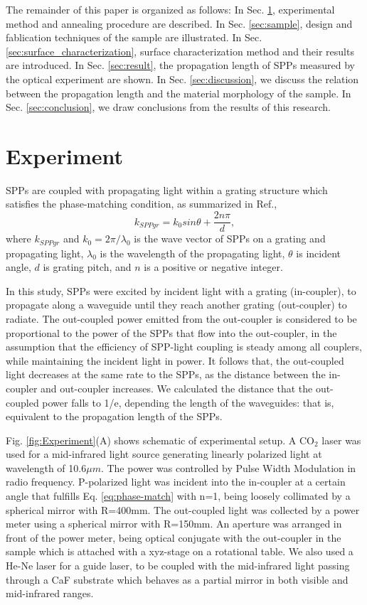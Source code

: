 \documentclass[twocolumn,11pt,a4]{article}
\begin{document}
The remainder of this paper is organized as follows: 
In Sec. \ref{sec:experiment}, experimental method and annealing procedure are described.
In Sec. \ref{sec:sample}, design and fablication techniques of the sample are illustrated.
In Sec. \ref{sec:surface_characterization}, surface characterization method and their results are introduced.
In Sec. \ref{sec:result}, the propagation length of SPPs measured by the optical experiment are shown.
In Sec. \ref{sec:discussion}, we discuss the relation between the propagation length and the material morphology of the sample.
In Sec. \ref{sec:conclusion}, we draw conclusions from the results of this research.

\section{Experiment}
\label{sec:experiment}
SPPs are coupled with propagating light within a grating structure which satisfies the phase-matching condition, as summarized in Ref.\cite{Koev},
\begin{equation}
k_{SPPgr}=k_0 sin\theta + \frac{2n\pi}{d},
\label{eq:phase-match}
\end{equation}
where $k_{SPPgr}$ and $k_0=2\pi/\lambda_0$ is the wave vector of SPPs on a grating and propagating light, $\lambda_0$ is the wavelength of the propagating light, $\theta$ is incident angle, $d$ is grating pitch, and $n$ is a positive or negative integer. 

In this study, SPPs were excited by incident light with a grating (in-coupler), to propagate along a waveguide until they reach another grating (out-coupler) to radiate. The out-coupled power emitted from the out-coupler is considered to be proportional to the power of the SPPs that flow into the out-coupler, in the assumption that the efficiency of SPP-light coupling is steady among all couplers, while maintaining the incident light in power. It follows that, the out-coupled light decreases at the same rate to the SPPs, as the distance between the in-coupler and out-coupler increases. We calculated the distance that the out-coupled power falls to 1/e, depending the length of the waveguides: that is, equivalent to the propagation length of the SPPs.  

Fig. \ref{fig:Experiment}(A) shows schematic of experimental setup. A $\mathrm{CO_2}$ laser was used for a mid-infrared light source generating linearly polarized light at wavelength of 10.6$\mu m$. The power was controlled by Pulse Width Modulation in radio frequency.
P-polarized light was incident into the in-coupler at a certain angle that fulfills Eq. \ref{eq:phase-match} with n=1, being loosely collimated by a spherical mirror with R=400mm. The out-coupled light was collected by a power meter using a spherical mirror with R=150mm. 
An aperture was arranged in front of the power meter, being optical conjugate with the out-coupler in the sample which is attached with a xyz-stage on a rotational table. We also used a He-Ne laser for a guide laser, to be coupled with the mid-infrared light passing through a CaF substrate which behaves as a partial mirror in both visible and mid-infrared ranges.
\end{document}
